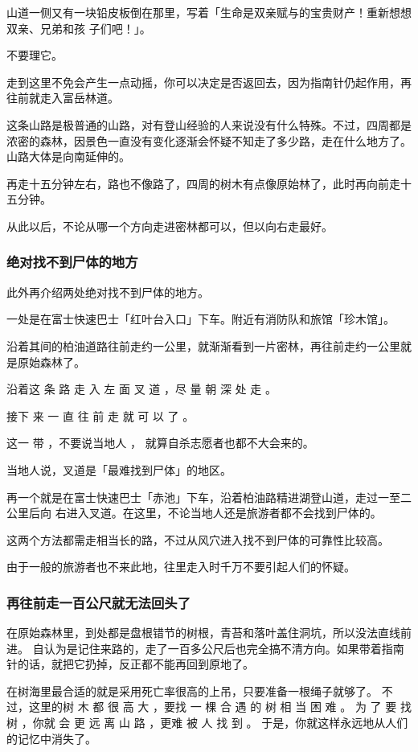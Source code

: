 \documentclass[UTF8]{ctexart}
\begin{document}
山道一侧又有一块铅皮板倒在那里，写着「生命是双亲赋与的宝贵财产！重新想想双亲、兄弟和孩
子们吧！」。

不要理它。

走到这里不免会产生一点动摇，你可以决定是否返回去，因为指南针仍起作用，再往前就走入富岳林道。

这条山路是极普通的山路，对有登山经验的人来说没有什么特殊。不过，四周都是浓密的森林，因景色一直没有变化逐渐会怀疑不知走了多少路，走在什么地方了。山路大体是向南延伸的。

再走十五分钟左右，路也不像路了，四周的树木有点像原始林了，此时再向前走十五分钟。

从此以后，不论从哪一个方向走进密林都可以，但以向右走最好。

\subsubsection*{绝对找不到尸体的地方}

此外再介绍两处绝对找不到尸体的地方。

一处是在富士快速巴士「红叶台入口」下车。附近有消防队和旅馆「珍木馆」。

沿着其间的柏油道路往前走约一公里，就渐渐看到一片密林，再往前走约一公里就是原始森林了。

沿着这 条 路 走 入 左 面 叉 道 ，尽 量 朝 深 处 走 。

接下 来 一 直 往 前 走 就 可 以 了 。

这一 带 ，不要说当地人 ， 就算自杀志愿者也都不大会来的。

当地人说，叉道是「最难找到尸体」的地区。

再一个就是在富士快速巴士「赤池」下车，沿着柏油路精进湖登山道，走过一至二公里后向
右进入叉道。在这里，不论当地人还是旅游者都不会找到尸体的。

这两个方法都需走相当长的路，不过从风穴进入找不到尸体的可靠性比较高。

由于一般的旅游者也不来此地，往里走入时千万不要引起人们的怀疑。

\subsubsection*{再往前走一百公尺就无法回头了}

在原始森林里，到处都是盘根错节的树根，青苔和落叶盖住洞坑，所以没法直线前进。
自认为是记住来路的，走了一百多公尺后也完全搞不清方向。如果带着指南针的话，就把它扔掉，反正都不能再回到原地了。

在树海里最合适的就是采用死亡率很高的上吊，只要准备一根绳子就够了。
不过，这里的树 木 都 很 高 大 ，要找 一 棵 合 遇 的 树 相 当 困 难 。
为 了 要 找 树 ，你就 会 更 远 离 山 路 ，更难 被 人 找 到 。 
于是，你就这样永远地从人们的记忆中消失了。
\end{document}
